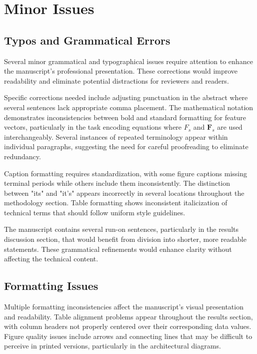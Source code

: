 \section{Minor Issues}
\label{sec:minor_issues}

\subsection{Typos and Grammatical Errors}
Several minor grammatical and typographical issues require attention to enhance the manuscript's professional presentation. These corrections would improve readability and eliminate potential distractions for reviewers and readers.

Specific corrections needed include adjusting punctuation in the abstract where several sentences lack appropriate comma placement. The mathematical notation demonstrates inconsistencies between bold and standard formatting for feature vectors, particularly in the task encoding equations where $F_s$ and $\mathbf{F}_s$ are used interchangeably. Several instances of repeated terminology appear within individual paragraphs, suggesting the need for careful proofreading to eliminate redundancy.

Caption formatting requires standardization, with some figure captions missing terminal periods while others include them inconsistently. The distinction between "its" and "it's" appears incorrectly in several locations throughout the methodology section. Table formatting shows inconsistent italicization of technical terms that should follow uniform style guidelines.

The manuscript contains several run-on sentences, particularly in the results discussion section, that would benefit from division into shorter, more readable statements. These grammatical refinements would enhance clarity without affecting the technical content.

\subsection{Formatting Issues}
Multiple formatting inconsistencies affect the manuscript's visual presentation and readability. Table alignment problems appear throughout the results section, with column headers not properly centered over their corresponding data values. Figure quality issues include arrows and connecting lines that may be difficult to perceive in printed versions, particularly in the architectural diagrams.

